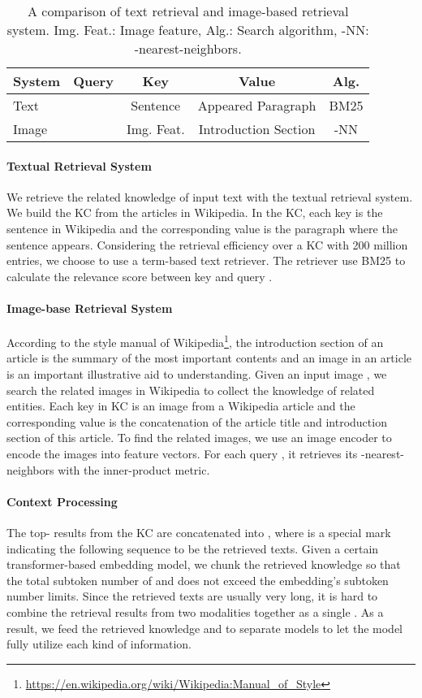 \documentclass[11pt]{article}
\begin{document}
\begin{table}[t!]
\small
\setlength\tabcolsep{3pt}
\centering
\begin{tabular}{l|cccc}
\toprule
\textbf{System} & \textbf{Query} & \textbf{Key} & \textbf{Value}  & \textbf{Alg.}    \\
\midrule
Text &  & Sentence & Appeared Paragraph & BM25 \\
Image &  & Img. Feat. & Introduction Section & -NN \\
\bottomrule
\end{tabular}
\caption{A comparison of text retrieval and image-based retrieval system. Img. Feat.: Image feature, Alg.: Search algorithm, -NN: -nearest-neighbors.}
\label{tab:retrieval}
\end{table}

\paragraph{Textual Retrieval System} 
We retrieve the related knowledge of input text  with the textual retrieval system. We build the KC from the articles in Wikipedia. In the KC, each key is the sentence in Wikipedia and the corresponding value is the paragraph where the sentence appears. Considering the retrieval efficiency over a KC with 200 million entries, we choose to use a term-based text retriever. The retriever use BM25 \cite{robertson1995okapi} to calculate the relevance score between key  and query . 

\paragraph{Image-base Retrieval System} 
According to the style manual of Wikipedia\footnote{\url{https://en.wikipedia.org/wiki/Wikipedia:Manual_of_Style}}, the introduction section of an article is the summary of the most important contents and an image in an article is an important illustrative aid to understanding. Given an input image , we search the related images in Wikipedia to collect the knowledge of related entities. Each key in KC is an image from a Wikipedia article and the corresponding value is the concatenation of the article title and introduction section of this article. To find the related images, we use an image encoder to encode the images into feature vectors. For each query , it retrieves its -nearest-neighbors with the inner-product metric.


\paragraph{Context Processing}
The top- results from the KC are concatenated into , where  is a special mark indicating the following sequence to be the retrieved texts. Given a certain transformer-based embedding model, we chunk the retrieved knowledge  so that the total subtoken number of  and  does not exceed the embedding's subtoken number limits.
Since the retrieved texts are usually very long, it is hard to combine the retrieval results from two modalities together as a single . As a result, we feed the retrieved knowledge  and  to separate models to let the model fully utilize each kind of information.
\end{document}
